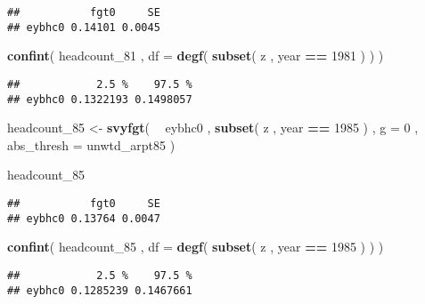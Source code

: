 \documentclass[]{book}
\newenvironment{Shaded}{\begin{snugshade}}{\end{snugshade}}
\newcommand{\DataTypeTok}[1]{\textcolor[rgb]{0.13,0.29,0.53}{#1}}
\newcommand{\DecValTok}[1]{\textcolor[rgb]{0.00,0.00,0.81}{#1}}
\newcommand{\KeywordTok}[1]{\textcolor[rgb]{0.13,0.29,0.53}{\textbf{#1}}}
\newcommand{\NormalTok}[1]{#1}
\newcommand{\OperatorTok}[1]{\textcolor[rgb]{0.81,0.36,0.00}{\textbf{#1}}}
\newcommand{\StringTok}[1]{\textcolor[rgb]{0.31,0.60,0.02}{#1}}
\begin{document}
\begin{verbatim}
##           fgt0     SE
## eybhc0 0.14101 0.0045
\end{verbatim}

\begin{Shaded}
\begin{Highlighting}[]
\KeywordTok{confint}\NormalTok{( headcount_}\DecValTok{81}\NormalTok{ , }\DataTypeTok{df =} \KeywordTok{degf}\NormalTok{( }\KeywordTok{subset}\NormalTok{( z , year }\OperatorTok{==}\StringTok{ }\DecValTok{1981}\NormalTok{ ) ) )}
\end{Highlighting}
\end{Shaded}

\begin{verbatim}
##            2.5 %    97.5 %
## eybhc0 0.1322193 0.1498057
\end{verbatim}

\begin{Shaded}
\begin{Highlighting}[]
\NormalTok{headcount_}\DecValTok{85}\NormalTok{ <-}\StringTok{ }
\StringTok{    }\KeywordTok{svyfgt}\NormalTok{( }
        \OperatorTok{~}\StringTok{ }\NormalTok{eybhc0 , }
        \KeywordTok{subset}\NormalTok{( z , year }\OperatorTok{==}\StringTok{ }\DecValTok{1985}\NormalTok{ ) , }
        \DataTypeTok{g =} \DecValTok{0}\NormalTok{ , }
        \DataTypeTok{abs_thresh =}\NormalTok{ unwtd_arpt85 }
\NormalTok{    )}
    
\NormalTok{headcount_}\DecValTok{85}
\end{Highlighting}
\end{Shaded}

\begin{verbatim}
##           fgt0     SE
## eybhc0 0.13764 0.0047
\end{verbatim}

\begin{Shaded}
\begin{Highlighting}[]
\KeywordTok{confint}\NormalTok{( headcount_}\DecValTok{85}\NormalTok{ , }\DataTypeTok{df =} \KeywordTok{degf}\NormalTok{( }\KeywordTok{subset}\NormalTok{( z , year }\OperatorTok{==}\StringTok{ }\DecValTok{1985}\NormalTok{ ) ) )}
\end{Highlighting}
\end{Shaded}

\begin{verbatim}
##            2.5 %    97.5 %
## eybhc0 0.1285239 0.1467661
\end{verbatim}
\end{document}
